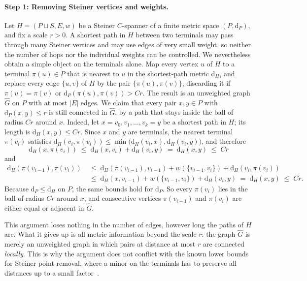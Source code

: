 \documentclass[11pt]{article}
\theoremstyle{definition}
\theoremstyle{remark}
\newcommand{\dH}{\mathrm{d}_H}
\newcommand{\dP}{\mathrm{d}_P}
\begin{document}
\paragraph{Step 1: Removing Steiner vertices and weights.}
Let $H = (P \sqcup S, E, w)$ be a Steiner $C$-spanner of a finite metric space $(P, \dP)$, and fix a scale $r > 0$. A shortest path in $H$ between two terminals may pass through many Steiner vertices and may use edges of very small weight, so neither the number of hops nor the individual weights can be controlled. We nevertheless obtain a simple object on the terminals alone. Map every vertex $u$ of $H$ to a terminal $\pi(u) \in P$ that is nearest to $u$ in the shortest-path metric $\dH$, and replace every edge $\{u, v\}$ of $H$ by the pair $\{\pi(u), \pi(v)\}$, discarding it if $\pi(u) = \pi(v)$ or $\dP(\pi(u), \pi(v)) > C r$. The result is an unweighted graph $\widehat{G}$ on $P$ with at most $|E|$ edges. We claim that every pair $x, y \in P$ with $\dP(x, y) \le r$ is still connected in $\widehat{G}$, by a path that stays inside the ball of radius $C r$ around $x$. Indeed, let $x = v_0, v_1, \dots, v_k = y$ be a shortest path in $H$; its length is $\dH(x, y) \le C r$. Since $x$ and $y$ are terminals, the nearest terminal $\pi(v_i)$ satisfies $\dH(v_i, \pi(v_i)) \le \min\bigl(\dH(v_i, x), \dH(v_i, y)\bigr)$, and therefore
\[
\dH(x, \pi(v_i)) \;\le\; \dH(x, v_i) + \dH(v_i, y) \;=\; \dH(x, y) \;\le\; C r
\]
and
\begin{align*}
\dH(\pi(v_{i-1}), \pi(v_i)) &\;\le\; \dH(\pi(v_{i-1}), v_{i-1}) + w(\{v_{i-1}, v_i\}) + \dH(v_i, \pi(v_i)) \\
&\;\le\; \dH(x, v_{i-1}) + w(\{v_{i-1}, v_i\}) + \dH(v_i, y) \;=\; \dH(x, y) \;\le\; C r.
\end{align*}
Because $\dP \le \dH$ on $P$, the same bounds hold for $\dP$. So every $\pi(v_i)$ lies in the ball of radius $C r$ around $x$, and consecutive vertices $\pi(v_{i-1})$ and $\pi(v_i)$ are either equal or adjacent in $\widehat{G}$.

This argument loses nothing in the number of edges, however long the paths of $H$ are. What it gives up is all metric information beyond the scale $r$: the graph $\widehat{G}$ is merely an unweighted graph in which pairs at distance at most $r$ are connected \emph{locally}. This is why the argument does not conflict with the known lower bounds for Steiner point removal, where a minor on the terminals has to preserve all distances up to a small factor~\cite{chan2006steiner,chen2024lower}.
\end{document}
